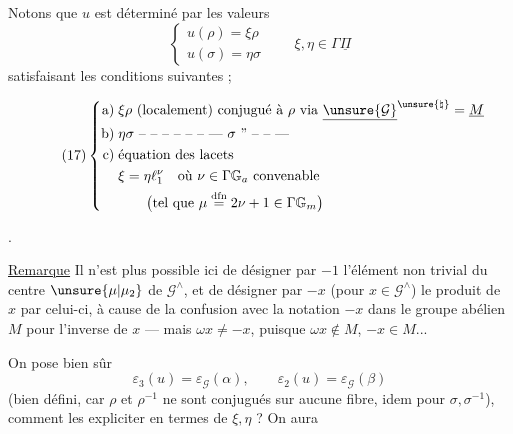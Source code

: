 
Notons que $u$ est déterminé par les valeurs
\[
\tag{16}
\begin{cases}
u(\rho)=\xi\rho\\
u(\sigma)=\eta\sigma
\end{cases}
\qquad\xi,\eta\in\Gamma\underline\Pi
\]
\inserted{$\xi,\eta$} satisfaisant les conditions suivantes ;


\[
\tag{17}
\left\{
\begin{aligned}
\text{a)}\;&\xi\rho\ \text{(localement) conjugué à }\rho\ \text{via }\underline{\unsure{\mathcal G}}^{\unsure{\natural}}=\underline M\\
\text{b)}\;&\eta\sigma\ \text{-- -- -- -- -- -- ---}\ \sigma\ \text{'' -- -- ---}\\
\text{c)}\;&\text{équation des lacets}\\
&\xi=\eta\ell_1^{\nu}\quad\text{où }\nu\in\Gamma\mathbb G_a\ \text{convenable}\\
&\qquad\bigl(\text{tel que }\mu\overset{\mathrm{dfn}}=2\nu+1\in\Gamma\mathbb G_m\bigr)
\end{aligned}\right.
\]

. 

\uline{Remarque} Il n'est plus possible ici de désigner par $-1$ l'élément non trivial \inserted{$\omega$} du centre $\unsure{\mu|\mu_2}$ de $\mathcal G^{\wedge}$, et de désigner par $-x$ (pour $x\in\mathcal G^{\wedge}$) le produit de $x$ par celui-ci, à cause de la confusion avec la notation $-x$  dans le groupe abélien $M$ pour l'inverse de $x$ --- mais  $\omega x\ne-x$, puisque $\omega x\notin M$, $-x\in M$...

On pose bien sûr
\[
\tag{18}
\varepsilon_3(u)=\varepsilon_{\mathcal G}(\alpha),\qquad
\varepsilon_2(u)=\varepsilon_{\mathcal G}(\beta)
\]
(bien défini, car $\rho$ et $\rho^{-1}$ ne sont conjugués sur aucune fibre, idem pour $\sigma,\sigma^{-1}$), comment les expliciter en termes de $\xi,\eta$ ? On aura

